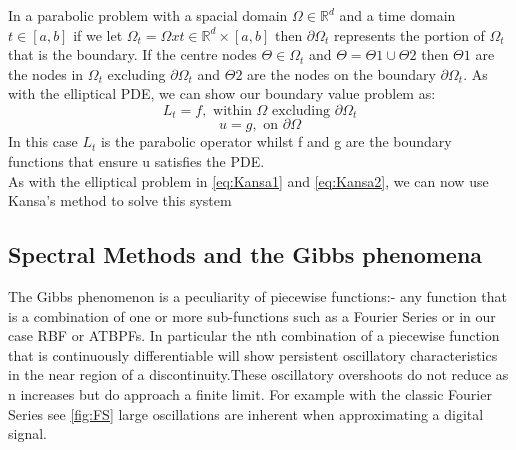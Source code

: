 \documentclass[a4paper]{amsart}
\begin{document}
In a parabolic problem with a spacial domain $\Omega \in \mathbb{R}^{d}$ and a time domain $t \in [a,b]$ if we let $\Omega_{t} = \Omega x t \in \mathbb{R}^{d} \times [a,b]$ then $\partial \Omega_{t}$ represents the portion of $\Omega_{t}$ that is the boundary.
If the centre nodes $\Theta \in \Omega_{t}$ and $\Theta = \Theta1 \cup \Theta2$ then $\Theta1$ are the nodes in $\Omega_{t}$ excluding $\partial \Omega_{t}$ and $\Theta2$ are the nodes on the boundary $\partial \Omega_{t}$. As with the elliptical PDE, we can show our boundary value problem as:
\begin{equation}
L_{t} = f, \mbox{ within } \Omega \mbox{ excluding } \partial \Omega_{t}
\end{equation}
\begin{equation}
u = g, \mbox{ on } \partial \Omega
\end{equation}
In this case $L_{t}$ is the parabolic operator whilst f and g are the boundary functions that ensure u satisfies the PDE.\\

As with the elliptical problem in \ref{eq:Kansa1} and \ref{eq:Kansa2}, we can now use Kansa's method to solve this system


\subsection{Spectral Methods and the Gibbs phenomena}

The Gibbs phenomenon is a peculiarity of piecewise functions:- any function that is a combination of one or more sub-functions such as a Fourier Series or in our case RBF or ATBPFs. In particular the nth combination of a piecewise function that is continuously differentiable will show persistent oscillatory characteristics in the near region of a discontinuity.These oscillatory overshoots do not reduce as n increases but do approach a finite limit. For example with the classic Fourier Series see \ref{fig:FS} large oscillations are inherent when approximating a digital signal.\\
\end{document}
